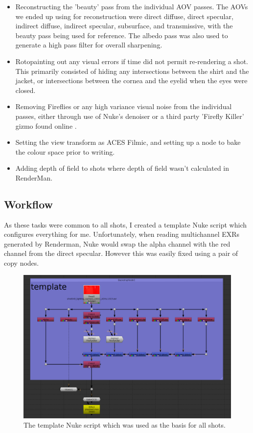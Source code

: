 \documentclass[11pt]{article}
\begin{document}
\begin{itemize}

\item Reconstructing the 'beauty' pass from the individual AOV passes. The AOVs we ended up using for reconstruction were direct diffuse, direct specular, indirect diffuse, indirect specular, subsurface, and transmissive, with the beauty pass being used for reference. The albedo pass was also used to generate a high pass filter for overall sharpening.

\item Rotopainting out any visual errors if time did not permit re-rendering a shot. This primarily consisted of hiding any intersections between the shirt and the jacket, or intersections between the cornea and the eyelid when the eyes were closed.

\item Removing Fireflies or any high variance visual noise from the individual passes, either through use of Nuke's denoiser or a third party 'Firefly Killer' gizmo found online \cite{muller_2015}.

\item Setting the view transform as ACES Filmic, and setting up a node to bake the colour space prior to writing.

\item Adding depth of field to shots where depth of field wasn't calculated in RenderMan.

\end{itemize}

\subsection{Workflow}

As these tasks were common to all shots, I created a template Nuke script which configures everything for me. Unfortunately, when reading multichannel EXRs generated by Renderman, Nuke would swap the alpha channel with the red channel from the direct specular. However this was easily fixed using a pair of copy nodes.

\begin{figure}[htbp]\centering
	\includegraphics[width=1.0\linewidth]{images/compTemplate.png}
	\caption{\label{figure:compTemplate} The template Nuke script which was used as the basis for all shots.}
\end{figure}
\end{document}

